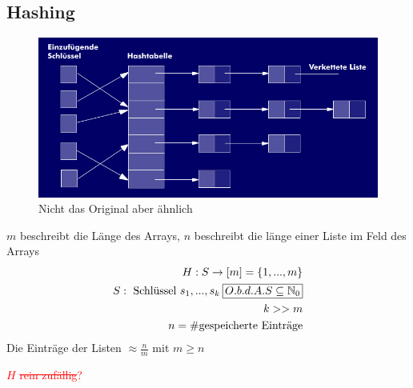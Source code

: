 \subsection{Hashing}
\begin{figure}[h]
    \centering
    \includegraphics[width=0.7\linewidth]{2022.05.17/hashtable.png}
    \caption{Nicht das Original aber ähnlich}
\end{figure}
$m$ beschreibt die Länge des Arrays, $n$ beschreibt die länge einer Liste im Feld des Arrays
\begin{align*}
    H: S \rightarrow [m] = \{1, ..., m\}\\
    S: \text{ Schlüssel } s_1, ..., s_k \:\rectangled{$O.b.d.A. S \subseteq \N_0$}\\
    k >> m\\
    n = \# \text{gespeicherte Einträge}
\end{align*}
Die Einträge der Listen $\approx \frac{n}{m}$ mit $m \geq n$\\
\begin{center}
\end{center}

\textcolor{red}{$H$ \grqq \sout{rein zufällig}\glqq?}

